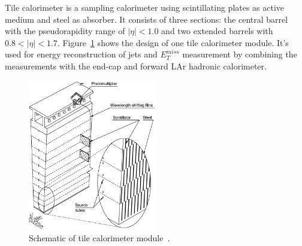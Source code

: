 Tile calorimeter is a sampling calorimeter using scintillating plates as active medium and steel as absorber.
It consists of three sections: the central barrel with the pseudorapidity range of $|\eta|<1.0$ and two extended barrels with $0.8 < |\eta| < 1.7$.
Figure~\ref{fig:calo_tile} shows the design of one tile calorimeter module.
It's used for energy reconstruction of jets and $E_{T}^{miss}$ measurement by combining the measurements with the end-cap and forward LAr hadronic calorimeter.
\begin{figure}[!htb]
  \centering
  \includegraphics[width=0.5\textwidth]{figures/Detector/calo_tile.png}
  \caption{Schematic of tile calorimeter module~\cite{Aad:2010}.}
  \label{fig:calo_tile}
\end{figure}

